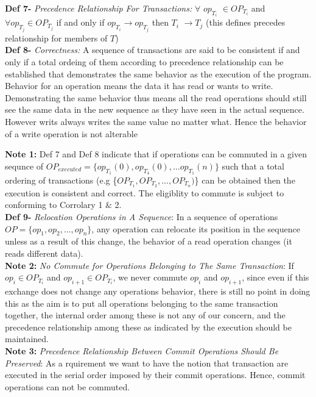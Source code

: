 \documentclass[a4paper, 11pt]{article}
\begin{document}
\textbf{Def 7-} \emph{Precedence Relationship For Transactions:} $\forall$ $op_{T_i}$ $\in OP_{T_i}$ and $\forall op_{T_j}\in OP_{T_j}$ if and only if $op_{T_i} \rightarrow op_{T_j}$ then $T_i$ $\rightarrow T_j$ \hspace{8mm} (this defines precedes relationship for members of $T$) \\

\textbf{Def 8-} \emph{Correctness:} A sequence of transactions are said to be consistent if and only if a total ordeing of them according to precedence relationship can be established that demonstrates the same behavior as the execution of the program. Behavior for an operation means the data it has read or wants to write. Demonstrating the same behavior thus means all the read operations should still see the same data in the new sequence as they have seen in the actual sequence. However writs always writes the same value no matter what. Hence the behavior of a write operation is not alterable

\textbf{Note 1:} Def 7 and Def 8 indicate that if operations can be commuted in a given sequnce of $OP_{executed} = \{op_{T_1}(0), op_{T_4}(0), ... op_{T_1}(n)\}$ such that a total ordering of transactions (e.g \{$OP_{T_1}, OP_{T_2}, ..., OP_{T_n}) $\} can be obtained then the execution is consistent and correct. The eligiblity to commute is subject to conforming to Corrolary 1 \& 2.\\

\textbf{Def 9-} \emph{Relocation Operations in A Sequence}: In a sequence of operations $OP = \{op_1, op_2, ...,op_n\}$, any operation can relocate its position in the sequence unless as a result of this change, the behavior of a read operation changes (it reads different data).\\

\textbf{Note 2:} \emph{No Commute for Operations Belonging to The Same Transaction}: If $op_i \in OP_{T_i}$ and $op_{i+1} \in OP_{T_i}$, we never commute $op_i$ and $op_{i+1}$, since even if this exchange does not change any operations behavior, there is still no point in doing this as the aim is to put all operations belonging to the same transaction together, the internal order among these is not any of our concern, and the precedence relationship among these as indicated by the execution should be maintained.\\ 

\textbf{Note 3:} \emph{Precedence Relationship Between Commit Operations Should Be Preserved}: As a rquirement we want to have the notion that transaction are executed in the serial order imposed by their commit operations. Hence, commit operations can not be commuted.\\
\end{document}
